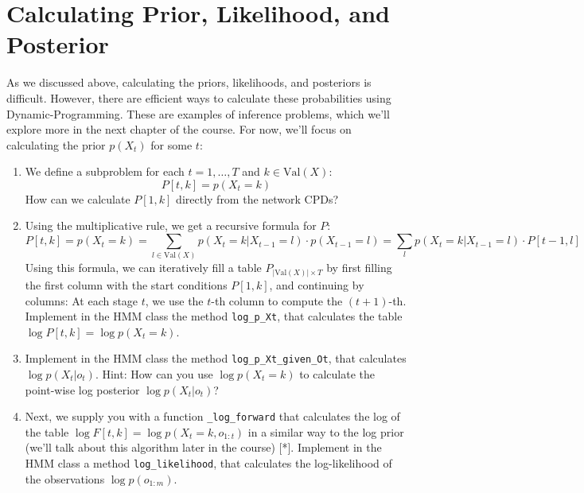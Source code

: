 \documentclass[a4 paper]{article}
\begin{document}
\begin{enumerate}
\end{enumerate}

\section{Calculating Prior, Likelihood, and Posterior}
As we discussed above, calculating the priors, likelihoods, and posteriors is difficult. However, there are efficient ways to calculate these probabilities using Dynamic-Programming. These are examples of inference problems, which we’ll explore more in the next chapter of the course. For now, we’ll focus on calculating the prior \( p(X_t) \) for some \( t \):

\begin{enumerate}
    \item We define a subproblem for each \( t = 1, \ldots, T \) and \( k \in \text{Val}(X) \):
    \[
    P[t, k] = p(X_t = k)
    \]
    How can we calculate \( P[1, k] \) directly from the network CPDs?
    
    \item Using the multiplicative rule, we get a recursive formula for \( P \):
    \[
    P[t, k] = p(X_t = k) = \sum_{l \in \text{Val}(X)} p(X_t = k | X_{t-1} = l) \cdot p(X_{t-1} = l) = \sum_{l} p(X_t = k | X_{t-1} = l) \cdot P[t-1, l]
    \]
    Using this formula, we can iteratively fill a table \( P_{|\text{Val}(X)| \times T} \) by first filling the first column with the start conditions \( P[1, k] \), and continuing by columns: At each stage \( t \), we use the \( t \)-th column to compute the \( (t+1) \)-th. Implement in the HMM class the method \texttt{log\_p\_Xt}, that calculates the table \( \log P[t, k] = \log p(X_t = k) \).
    
    \item Implement in the HMM class the method \texttt{log\_p\_Xt\_given\_Ot}, that calculates \( \log p(X_t | o_t) \). Hint: How can you use \( \log p(X_t = k) \) to calculate the point-wise log posterior \( \log p(X_t | o_t) \)?
    
    \item Next, we supply you with a function \texttt{\_log\_forward} that calculates the log of the table \( \log F[t, k] = \log p(X_t = k, o_{1:t}) \) in a similar way to the log prior (we’ll talk about this algorithm later in the course) [*]. Implement in the HMM class a method \texttt{log\_likelihood}, that calculates the log-likelihood of the observations \( \log p(o_{1:m}) \).
\end{enumerate}
\end{document}
